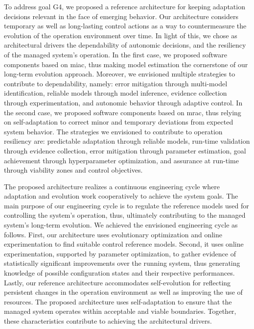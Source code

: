 \begin{description}[style=unboxed,leftmargin=0cm,font=\bfseries\normalsize]
	To address goal \textsc{G}4, we proposed a reference architecture for keeping adaptation decisions relevant in the face of emerging behavior. Our architecture considers temporary as well as long-lasting control actions as a way to countermeasure the evolution of the operation environment over time. In light of this, we chose as architectural drivers the dependability of autonomic decisions, and the resiliency of the managed system's operation. In the first case, we proposed software components based on \gls{miac}, thus making model estimation the cornerstone of our long-term evolution approach. Moreover, we envisioned multiple strategies to contribute to dependability, namely: error mitigation through multi-model identification, reliable models through model inference, evidence collection through experimentation, and autonomic behavior through adaptive control. In the second case, we proposed software components based on \gls{mrac}, thus relying on self-adaptation to correct minor and temporary deviations from expected system behavior. The strategies we envisioned to contribute to operation resiliency are: predictable adaptation through reliable models, run-time validation through evidence collection, error mitigation through parameter estimation, goal achievement through hyperparameter optimization, and assurance at run-time through viability zones and control objectives.

	The proposed architecture realizes a continuous engineering cycle where adaptation and evolution work cooperatively to achieve the system goals. The main purpose of our engineering cycle is to regulate the reference models used for controlling the system's operation, thus, ultimately contributing to the managed system's long-term evolution. We achieved the envisioned engineering cycle as follows. First, our architecture uses evolutionary optimization and online experimentation to find suitable control reference models. Second, it uses online experimentation, supported by parameter optimization, to gather evidence of statistically significant improvements over the running system, thus generating knowledge of possible configuration states and their respective performances. Lastly, our reference architecture accommodates self-evolution for reflecting persistent changes in the operation environment as well as improving the use of resources. The proposed architecture uses self-adaptation to ensure that the managed system operates within acceptable and viable boundaries. Together, these characteristics contribute to achieving the architectural drivers.


\end{description}
